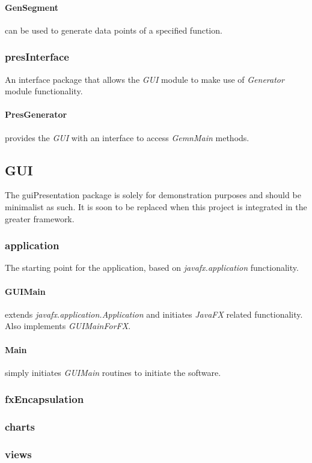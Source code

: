 \documentclass[main.tex]{subfiles}
\begin{document}
        \paragraph{GenSegment} can be used to generate data points of a specified function.
      
      \subsubsection*{presInterface}
        
        An interface package that allows the \textit{GUI} module to make use of \textit{Generator} module functionality.
        
        \paragraph{PresGenerator} provides the \textit{GUI} with an interface to access \textit{GemnMain} methods.
      
    \subsection{GUI}
      
      The guiPresentation package is solely for demonstration purposes and should be minimalist as such. It is soon to be replaced when this project is integrated in the greater framework.
      
      \subsubsection*{application}
        
        The starting point for the application, based on \textit{javafx.application} functionality.
        
        \paragraph{GUIMain} extends \textit{javafx.application.Application} and initiates \textit{JavaFX} related functionality.\\
        Also implements \textit{GUIMainForFX}.
        
        \paragraph{Main} simply initiates \textit{GUIMain} routines to initiate the software.
      
      \subsubsection*{fxEncapsulation}
        
      \subsubsection*{charts}
        
      \subsubsection*{views}
        
      
      
\end{document}
